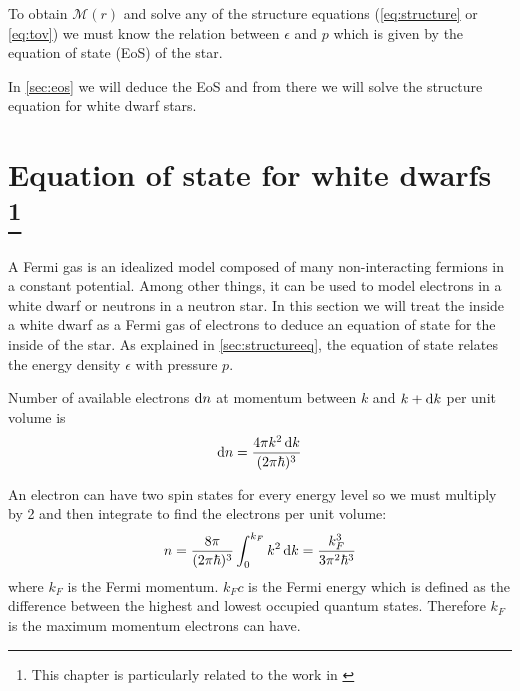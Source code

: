 \documentclass[a4paper]{article}
\newcommand\M{\mathcal{M}}
\begin{document}
To obtain $\M(r)$ and solve any of the structure equations (\eqref{eq:structure} or \eqref{eq:tov}) we must know the relation between $\epsilon$ and $p$ which is given by the equation of state (EoS) of the star.

In \autoref{sec:eos} we will deduce the EoS and from there we will solve the structure equation for white dwarf stars.


\section[Equation of state for white dwarfs]{Equation of state for white dwarfs \footnote{This chapter is particularly related to the work in \cite{silbarNeutronStarsUndergraduates2004}}} \label{sec:eos}

A Fermi gas is an idealized model composed of many non-interacting fermions in a constant potential. Among other things, it can be used to model electrons in a white dwarf or neutrons in a neutron star. In this section we will treat the inside a white dwarf as a Fermi gas of electrons to deduce an equation of state for the inside of the star. As explained in \autoref{sec:structureeq}, the equation of state relates the energy density $\epsilon$ with pressure $p$.

Number of available electrons $\odif{n}$ at momentum between $k$ and $k+\odif{k}$ per unit volume is \cite{pathria_beale}
\begin{equation} \label{eq:electrondndk}
    \odif{n} = \frac{4\pi k^2 \odif{k}}{(2\pi\hbar)^3}
\end{equation}

An electron can have two spin states for every energy level so we must multiply by 2 and then integrate to find the electrons per unit volume:
\begin{equation} \label{eq:4}
    n = \frac{8\pi}{(2\pi\hbar)^3}\int^{k_F}_{0}k^2 \odif{k} = \frac{k_F^3}{3\pi^2\hbar^3}
\end{equation}
where $k_F$ is the Fermi momentum. $k_F c$ is the Fermi energy which is defined as the difference between the highest and lowest occupied quantum states. Therefore $k_F$ is the maximum momentum electrons can have. 
\end{document}
